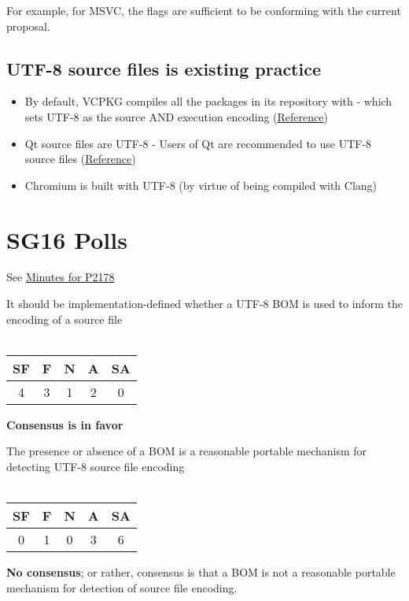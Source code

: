 \documentclass{wg21}
\begin{document}
For example, for MSVC, the flags  are sufficient to be conforming with the current proposal.


\subsection{UTF-8 source files is existing practice}

\begin{itemize}
    \item By default, VCPKG compiles all the packages in its repository with  - which sets UTF-8 as the source AND execution encoding (\href{https://github.com/vicroms/vcpkg/blob/master/scripts/toolchains/windows.cmake#L16}{Reference})
    \item Qt source files are UTF-8 - Users of Qt are recommended to use UTF-8 source files (\href{https://wiki.qt.io/Strings_and_encodings_in_Qt}{Reference})
    \item Chromium is built with UTF-8 (by virtue of being compiled with Clang)
\end{itemize}
\pagebreak
\section{SG16 Polls}

See \href{https://github.com/sg16-unicode/sg16-meetings/blob/master/README-2020.md}{Minutes for P2178}

\begin{quoteblock}
It should be implementation-defined whether a UTF-8 BOM is used to inform the encoding of a source file
\\\\    
\begin{tabular}{|c|c|c|c|c|}
\hline
SF & F & N & A & SA \\
\hline
4 & 3 & 1 & 2 & 0 \\
\hline
\end{tabular}

\textbf{Consensus is in favor}
\end{quoteblock}

\begin{quoteblock}
The presence or absence of a BOM is a reasonable portable mechanism
for detecting UTF-8 source file encoding
\\\\
\begin{tabular}{|c|c|c|c|c|}
\hline
SF & F & N & A & SA \\
\hline
0 & 1 & 0 & 3 & 6 \\
\hline
\end{tabular}

\textbf{No consensus};  or rather,
consensus is that a BOM is not a reasonable portable mechanism for detection of source file encoding.    
\end{quoteblock}
\end{document}
